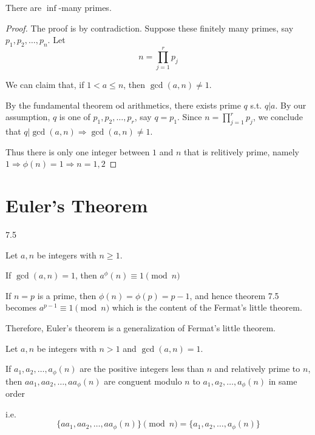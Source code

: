 \begin{corollary}
    There are $\inf$-many primes.
\end{corollary}
\begin{proof}
    The proof is by contradiction. Suppose these finitely many primes, say $p_1, p_2, \ldots, p_n$.
    Let
    \[
        n = \prod_{j=1}^{r}p_j
    \]

    We can claim that, if $1 < a \leq n$, then $\gcd(a, n) \neq 1$.

    By the fundamental theorem od arithmetics, there exists prime $q$ s.t. $q | a$.
    By our assumption, $q$ is one of $p_1, p_2, \dots, p_r$, say $q = p_1$.
    Since $n = \prod_{j=1}^{r}p_j$, we conclude that $q | \gcd(a, n) \Rightarrow \gcd(a, n) \neq 1$.

    Thus there is only one integer between $1$ and $n$ that is relitively prime, namely $1 \Rightarrow \phi(n) = 1 \Rightarrow n = 1, 2$
\end{proof}

\setcounter{section}{2}
\section{Euler's Theorem}

\begin{theorem}
    7.5

    Let $a, n$ be integers with $n \geq 1$.

    If $\gcd(a, n) = 1$, then $a^\phi(n) \equiv 1 \pmod n$

\end{theorem}
\begin{remark}
    If $n = p$ is a prime, then $\phi(n) = \phi(p) = p - 1$, and hence theorem 7.5 becomes $a^{p-1} \equiv 1 \pmod n$
    which is the content of the Fermat's little theorem.

    Therefore, Euler's theorem is a generalization of Fermat's little theorem.
\end{remark}

\begin{lemma}
    Let $a, n$ be integers with $n > 1$ and $\gcd(a, n) = 1$.

    If $a_1, a_2, \dots, a_\phi(n)$ are the positive integers less than $n$ and relatively prime to $n$, then
    $aa_1, aa_2, \dots, aa_\phi(n)$ are conguent modulo $n$ to $a_1, a_2, \dots, a_\phi(n)$ in same order

    i.e.
    \[
        \{aa_1, aa_2, \dots, aa_\phi(n)\} \pmod n = \{a_1, a_2, \dots, a_\phi(n)\}
    \]
\end{lemma}
